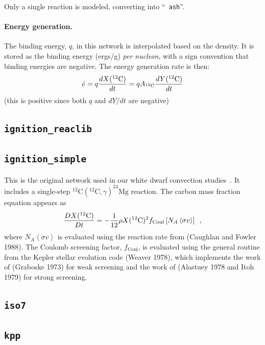 Only a single reaction is modeled, converting  into ``{\tt
  ash}''.

\paragraph{Energy generation.} The binding energy, $q$, in this 
network is interpolated based on the density.  It is stored as the
binding energy (ergs/g) {\em per nucleon}, with a sign convention that
binding energies are negative.  The energy generation rate is then:
\begin{equation}
\edot = q \frac{dX(\isotm{C}{12})}{dt} = q A_{\isotm{C}{12}} \frac{dY(\isotm{C}{12})}{dt}
\end{equation}
(this is positive since both $q$ and $dY/dt$ are negative)

\subsection{{\tt ignition\_reaclib}}

\subsection{{\tt ignition\_simple}}

This is the original network used in our white dwarf convection
studies~\cite{lowMach4}.  It includes a single-step
$^{12}\mathrm{C}(^{12}\mathrm{C},\gamma)^{24}\mathrm{Mg}$ reaction.
The carbon mass fraction equation appears as
\begin{equation}
\frac{D X(^{12}\mathrm{C})}{Dt} = - \frac{1}{12} \rho X(^{12}\mathrm{C})^2
    f_\mathrm{Coul} \left [N_A \left <\sigma v \right > \right]\enskip,
\end{equation}
where $N_A \left <\sigma v\right>$ is evaluated using the reaction
rate from (Caughlan and Fowler 1988).  The Coulomb screening factor,
$f_\mathrm{Coul}$, is evaluated using the general routine from the
Kepler stellar evolution code (Weaver 1978), which implements the work
of (Graboske 1973) for weak screening and the work of (Alastuey 1978
and Itoh 1979) for strong screening.


\subsection{{\tt iso7}}


\subsection{{\tt kpp}}


